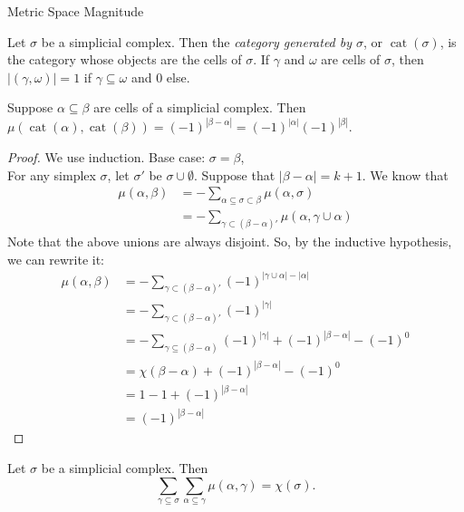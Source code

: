 \documentclass[12pt]{pom_thesis}
\DeclareMathOperator{\cat}{cat}
\begin{document}
\begin{chapter}{Metric Space Magnitude}

\begin{defn}
Let $\sigma$ be a simplicial complex. Then the \emph{category generated by $\sigma$}, or $\cat(\sigma)$, is the category whose objects are the cells of $\sigma$. If $\gamma$ and $\omega$ are cells of $\sigma$, then $|(\gamma, \omega)| = 1$ if $\gamma \subseteq \omega$ and 0 else.
\end{defn}
\begin{lemma}
\label{mu_lemma}
Suppose $\alpha \subseteq \beta$ are cells of a simplicial complex. Then $\mu(\cat(\alpha), \cat(\beta)) =(-1)^{|\beta - \alpha|} = (-1)^{|\alpha|} (-1)^{|\beta|}$.
\end{lemma}
\begin{proof}
We use induction. Base case: $\sigma = \beta$, \checkmark \\
For any simplex $\sigma$, let $\sigma'$ be $\sigma \cup \emptyset$. Suppose that $|\beta - \alpha| = k+1$. We know that \begin{align*}
\mu(\alpha, \beta) &=  - \sum_{\alpha \subseteq \sigma \subset \beta} \mu(\alpha, \sigma)\\
&= - \sum_{\gamma \subset (\beta - \alpha)'} \mu(\alpha, \gamma \cup \alpha) 
\end{align*}
Note that the above unions are always disjoint. So, by the inductive hypothesis, we can rewrite it:
\begin{align*}
\mu(\alpha, \beta) &= - \sum_{\gamma \subset (\beta - \alpha)'} (-1)^{|\gamma \cup \alpha| - |\alpha|} \\ %
&= - \sum_{\gamma \subset (\beta - \alpha)'} (-1)^{|\gamma|}\\ %
&= - \sum_{\gamma \subseteq (\beta - \alpha)} (-1)^{|\gamma|} + (-1)^{|\beta - \alpha|} - (-1)^0 \\ %
&= \chi(\beta - \alpha) + (-1)^{|\beta - \alpha|} - (-1)^0\\
&= 1-1+ (-1)^{|\beta - \alpha|}\\
&= (-1)^{|\beta - \alpha|}
\end{align*}


\end{proof}
\begin{thm}
\label{consistentEuler}
Let $\sigma$ be a simplicial complex. Then 
\[
\sum_{\gamma \subseteq \sigma} \sum_{\alpha \subseteq \gamma} \mu(\alpha, \gamma) = \chi(\sigma).
\]


\end{thm}
\end{chapter}
\end{document}
